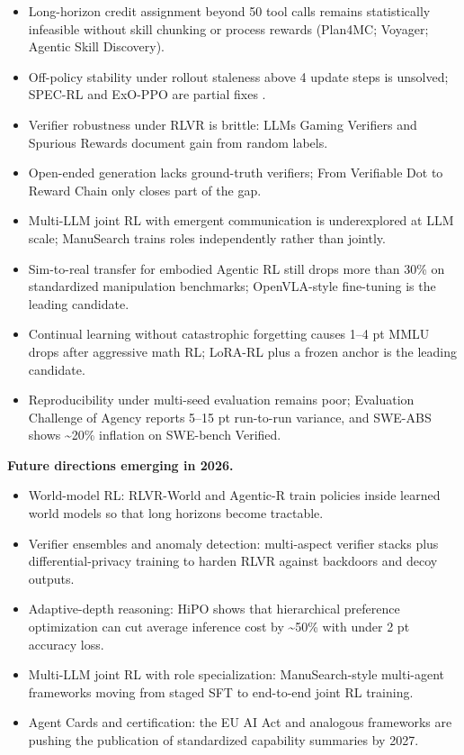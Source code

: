 \documentclass{article}
\begin{document}
\begin{itemize}

\item
  Long-horizon credit assignment beyond 50 tool calls remains statistically infeasible without skill chunking or process rewards (Plan4MC; Voyager; Agentic Skill Discovery).
\item
  Off-policy stability under rollout staleness above 4 update steps is unsolved; SPEC-RL and ExO-PPO are partial fixes \citep{liu20262026}.
\item
  Verifier robustness under RLVR is brittle: LLMs Gaming Verifiers \citep{helff20262026} and Spurious Rewards \citep{shao20252025} document gain from random labels.
\item
  Open-ended generation lacks ground-truth verifiers; From Verifiable Dot to Reward Chain \citep{jiang20262026} only closes part of the gap.
\item
  Multi-LLM joint RL with emergent communication is underexplored at LLM scale; ManuSearch \citep{huang20252025} trains roles independently rather than jointly.
\item
  Sim-to-real transfer for embodied Agentic RL still drops more than 30\% on standardized manipulation benchmarks; OpenVLA-style fine-tuning is the leading candidate.
\item
  Continual learning without catastrophic forgetting causes 1--4 pt MMLU drops after aggressive math RL; LoRA-RL plus a frozen anchor is the leading candidate.
\item
  Reproducibility under multi-seed evaluation remains poor; Evaluation Challenge of Agency \citep{dong20262026} reports 5--15 pt run-to-run variance, and SWE-ABS \citep{yu20262026} shows \textasciitilde20\% inflation on SWE-bench Verified.
\end{itemize}

\textbf{Future directions emerging in 2026.}

\begin{itemize}

\item
  World-model RL: RLVR-World \citep{wu20252025} and Agentic-R \citep{liu20262026} train policies inside learned world models so that long horizons become tractable.
\item
  Verifier ensembles and anomaly detection: multi-aspect verifier stacks plus differential-privacy training to harden RLVR against backdoors and decoy outputs.
\item
  Adaptive-depth reasoning: HiPO \citep{kachroo20262026} shows that hierarchical preference optimization can cut average inference cost by \textasciitilde50\% with under 2 pt accuracy loss.
\item
  Multi-LLM joint RL with role specialization: ManuSearch-style multi-agent frameworks moving from staged SFT to end-to-end joint RL training.
\item
  Agent Cards and certification: the EU AI Act and analogous frameworks are pushing the publication of standardized capability summaries by 2027.
\end{itemize}
\end{document}
